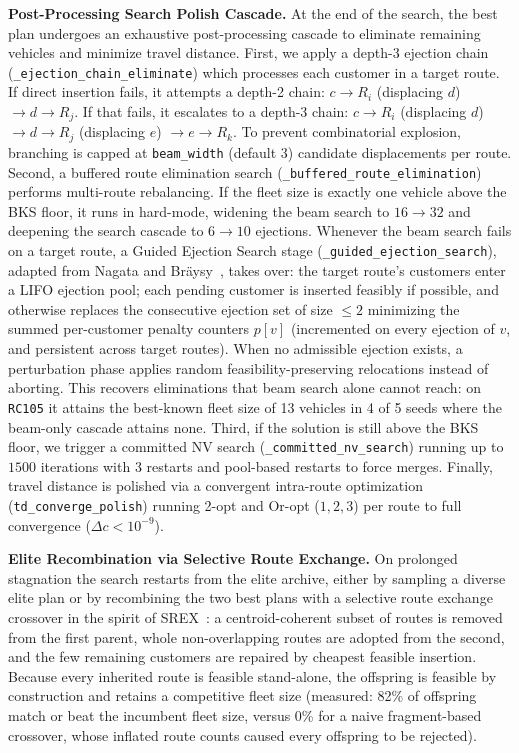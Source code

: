\documentclass[conference]{IEEEtran}
\begin{document}
\textbf{Post-Processing Search Polish Cascade.}
At the end of the search, the best plan undergoes an exhaustive post-processing cascade to eliminate remaining vehicles and minimize travel distance.
First, we apply a depth-3 ejection chain (\texttt{\_ejection\_chain\_eliminate}) which processes each customer in a target route. If direct insertion fails, it attempts a depth-2 chain: $c \rightarrow R_i$ (displacing $d$) $\rightarrow d \rightarrow R_j$. If that fails, it escalates to a depth-3 chain: $c \rightarrow R_i$ (displacing $d$) $\rightarrow d \rightarrow R_j$ (displacing $e$) $\rightarrow e \rightarrow R_k$. To prevent combinatorial explosion, branching is capped at \texttt{beam\_width} (default $3$) candidate displacements per route.
Second, a buffered route elimination search (\texttt{\_buffered\_route\_elimination}) performs multi-route rebalancing. If the fleet size is exactly one vehicle above the BKS floor, it runs in hard-mode, widening the beam search to $16 \to 32$ and deepening the search cascade to $6 \to 10$ ejections.
Whenever the beam search fails on a target route, a Guided Ejection Search stage (\texttt{\_guided\_ejection\_search}), adapted from Nagata and Br\"aysy~\cite{nagata2009ges}, takes over: the target route's customers enter a LIFO ejection pool; each pending customer is inserted feasibly if possible, and otherwise replaces the consecutive ejection set of size $\le 2$ minimizing the summed per-customer penalty counters $p[v]$ (incremented on every ejection of $v$, and persistent across target routes). When no admissible ejection exists, a perturbation phase applies random feasibility-preserving relocations instead of aborting. This recovers eliminations that beam search alone cannot reach: on \texttt{RC105} it attains the best-known fleet size of 13 vehicles in 4 of 5 seeds where the beam-only cascade attains none.
Third, if the solution is still above the BKS floor, we trigger a committed NV search (\texttt{\_committed\_nv\_search}) running up to $1500$ iterations with $3$ restarts and pool-based restarts to force merges.
Finally, travel distance is polished via a convergent intra-route optimization (\texttt{td\_converge\_polish}) running 2-opt and Or-opt ($1, 2, 3$) per route to full convergence ($\Delta c < 10^{-9}$).

\textbf{Elite Recombination via Selective Route Exchange.}
On prolonged stagnation the search restarts from the elite archive, either by sampling a diverse elite plan or by recombining the two best plans with a selective route exchange crossover in the spirit of SREX~\cite{nagata2010srex}: a centroid-coherent subset of routes is removed from the first parent, whole non-overlapping routes are adopted from the second, and the few remaining customers are repaired by cheapest feasible insertion. Because every inherited route is feasible stand-alone, the offspring is feasible by construction and retains a competitive fleet size (measured: 82\% of offspring match or beat the incumbent fleet size, versus 0\% for a naive fragment-based crossover, whose inflated route counts caused every offspring to be rejected).
\end{document}
